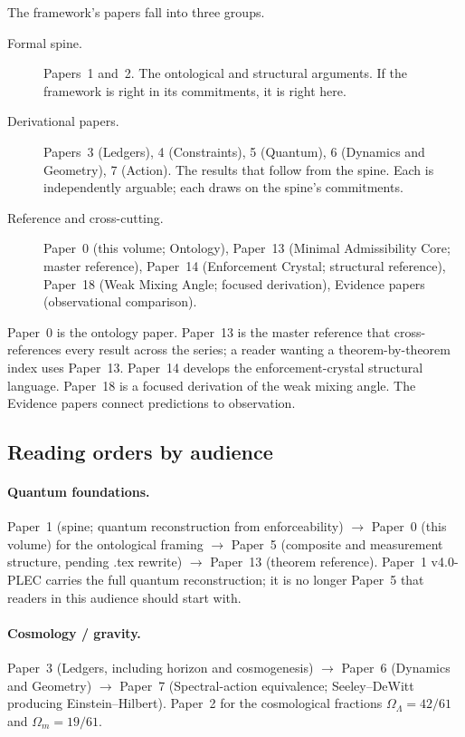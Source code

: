 \documentclass[11pt]{article}
\begin{document}
The framework's papers fall into three groups.

\begin{description}
    \item[Formal spine.] Papers~1 and~2. The ontological and structural arguments. If the framework is right in its commitments, it is right here.
    \item[Derivational papers.] Papers~3 (Ledgers), 4 (Constraints), 5 (Quantum), 6 (Dynamics and Geometry), 7 (Action). The results that follow from the spine. Each is independently arguable; each draws on the spine's commitments.
    \item[Reference and cross-cutting.] Paper~0 (this volume; Ontology), Paper~13 (Minimal Admissibility Core; master reference), Paper~14 (Enforcement Crystal; structural reference), Paper~18 (Weak Mixing Angle; focused derivation), Evidence papers (observational comparison).
\end{description}

\noindent Paper~0 is the ontology paper. Paper~13 is the master reference that cross-references every result across the series; a reader wanting a theorem-by-theorem index uses Paper~13. Paper~14 develops the enforcement-crystal structural language. Paper~18 is a focused derivation of the weak mixing angle. The Evidence papers connect predictions to observation.

\subsection{Reading orders by audience}\label{sec:reading_orders}

\paragraph{Quantum foundations.} Paper~1 (spine; quantum reconstruction from enforceability) $\to$ Paper~0 (this volume) for the ontological framing $\to$ Paper~5 (composite and measurement structure, pending .tex rewrite) $\to$ Paper~13 (theorem reference). Paper~1 v4.0-PLEC carries the full quantum reconstruction; it is no longer Paper~5 that readers in this audience should start with.

\paragraph{Cosmology / gravity.} Paper~3 (Ledgers, including horizon and cosmogenesis) $\to$ Paper~6 (Dynamics and Geometry) $\to$ Paper~7 (Spectral-action equivalence; Seeley--DeWitt producing Einstein--Hilbert). Paper~2 for the cosmological fractions $\Omega_\Lambda = 42/61$ and $\Omega_m = 19/61$.
\end{document}
